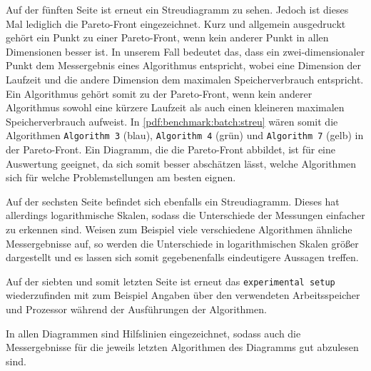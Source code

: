 Auf der fünften Seite ist erneut ein Streudiagramm zu sehen. Jedoch ist dieses Mal lediglich die Pareto-Front eingezeichnet. Kurz und allgemein ausgedruckt gehört ein Punkt zu einer Pareto-Front, wenn kein anderer Punkt in allen Dimensionen \glqq besser\grqq{} ist.
In unserem Fall bedeutet das, dass ein zwei-dimensionaler Punkt dem Messergebnis eines Algorithmus entspricht, wobei eine Dimension der Laufzeit und die andere Dimension dem maximalen Spei\-cher\-ver\-brauch entspricht. Ein Algorithmus gehört somit zu der Pareto-Front, wenn kein anderer Algorithmus sowohl eine kürzere Laufzeit als auch einen kleineren maximalen Spei\-cher\-ver\-brauch aufweist. In \cref{pdf:benchmark:batch:streu} wären somit die Algorithmen \texttt{Algorithm 3} (blau), \texttt{Algorithm 4} (grün) und \texttt{Algorithm 7} (gelb) in der Pareto-Front.
Ein Diagramm, die die Pareto-Front abbildet, ist für eine Auswertung geeignet, da sich somit besser abschätzen lässt, welche Algorithmen sich für welche Problemstellungen am besten eignen.

Auf der sechsten Seite befindet sich ebenfalls ein Streudiagramm. Dieses hat allerdings logarithmische Skalen, sodass die Unterschiede der Messungen einfacher zu erkennen sind. Weisen zum Beispiel viele verschiedene Algorithmen ähnliche Mess\-er\-geb\-nisse auf, so werden die Unterschiede in logarithmischen Skalen größer dargestellt und es lassen sich somit gegebenenfalls eindeutigere Aussagen treffen.

Auf der siebten und somit letzten Seite ist erneut das \texttt{experimental setup} wiederzufinden mit zum Beispiel Angaben über den verwendeten Ar\-beits\-spei\-cher und Prozessor während der Ausführungen der Algorithmen.

In allen Diagrammen sind Hilfslinien eingezeichnet, sodass auch die Mess\-er\-geb\-nisse für die jeweils letzten Algorithmen des Diagramms gut abzulesen sind.